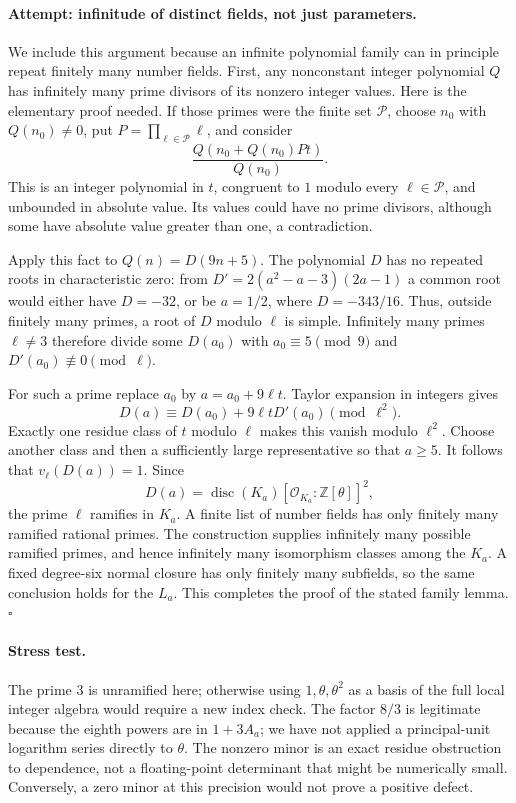 \documentclass[11pt,a4paper]{article}
\newcommand{\Z}{\mathbb{Z}}
\numberwithin{equation}{section}
\begin{document}
\paragraph{Attempt: infinitude of distinct fields, not just parameters.}
We include this argument because an infinite polynomial family can in
principle repeat finitely many number fields. First, any nonconstant
integer polynomial $Q$ has infinitely many prime divisors of its nonzero
integer values. Here is the elementary proof needed. If those primes were
the finite set $\mathcal P$, choose $n_0$ with $Q(n_0)\ne0$, put
$P=\prod_{\ell\in\mathcal P}\ell$, and consider
\[
 \frac{Q(n_0+Q(n_0)Pt)}{Q(n_0)}.
\]
This is an integer polynomial in $t$, congruent to $1$ modulo every
$\ell\in\mathcal P$, and unbounded in absolute value. Its values could
have no prime divisors, although some have absolute value greater than one,
a contradiction.

Apply this fact to $Q(n)=D(9n+5)$. The polynomial $D$ has no repeated roots
in characteristic zero: from
$D'=2(a^2-a-3)(2a-1)$ a common root would either have
$D=-32$, or be $a=1/2$, where $D=-343/16$. Thus, outside finitely many
primes, a root of $D$ modulo $\ell$ is simple. Infinitely many primes
$\ell\ne3$ therefore divide some $D(a_0)$ with $a_0\equiv5\pmod9$ and
$D'(a_0)\not\equiv0\pmod\ell$.

For such a prime replace $a_0$ by $a=a_0+9\ell t$. Taylor expansion in
integers gives
\[
 D(a)\equiv D(a_0)+9\ell tD'(a_0)\pmod{\ell^2}.
\]
Exactly one residue class of $t$ modulo $\ell$ makes this vanish modulo
$\ell^2$. Choose another class and then a sufficiently large representative
so that $a\ge5$. It follows that $v_\ell(D(a))=1$. Since
\[
 D(a)=\operatorname{disc}(K_a)
       [\mathcal O_{K_a}:\Z[\theta]]^2,
\]
the prime $\ell$ ramifies in $K_a$. A finite list of number fields has only
finitely many ramified rational primes. The construction supplies
infinitely many possible ramified primes, and hence infinitely many
isomorphism classes among the $K_a$. A fixed degree-six normal closure has
only finitely many subfields, so the same conclusion holds for the $L_a$.
This completes the proof of the stated family lemma. \hfill$\square$

\paragraph{Stress test.}
The prime $3$ is unramified here; otherwise using $1,\theta,\theta^2$ as a
basis of the full local integer algebra would require a new index check.
The factor $8/3$ is legitimate because the eighth powers are in $1+3A_a$;
we have not applied a principal-unit logarithm series directly to $\theta$.
The nonzero minor is an exact residue obstruction to dependence, not a
floating-point determinant that might be numerically small. Conversely,
a zero minor at this precision would not prove a positive defect.
\end{document}
